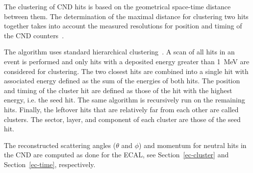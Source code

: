 The clustering of CND hits is based on the geometrical space-time distance between them. The determination of
the maximal distance for clustering two hits together takes into account the measured resolutions for position and
timing of the CND counters~\cite{cnd-nim}.

The algorithm uses standard hierarchical clustering~\cite{Day1984}. A scan of all hits in an event is performed and
only hits with a deposited energy greater than 1~MeV are considered for clustering. The two closest hits are
combined into a single hit with associated energy defined as the sum of the energies of both hits. The position and
timing of the cluster hit are defined as those of the hit with the highest energy, i.e. the seed hit. The same algorithm
is recursively run on the remaining hits. Finally, the leftover hits that are relatively far from each other are called
clusters. The sector, layer, and component of each cluster are those of the seed hit.

The reconstructed scattering angles ($\theta$ and $\phi$) and momentum for neutral hits in the CND are computed
as done for the ECAL, see Section~\ref{ec-cluster} and Section~\ref{ec-time}, respectively.
